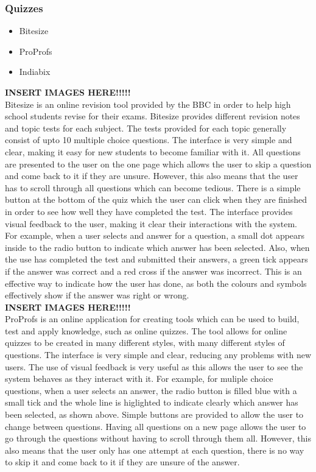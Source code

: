 \documentclass{article}
\begin{document}
\subsubsection{Quizzes}

\begin{itemize}
\item Bitesize
\item ProProfs
\item Indiabix
\end{itemize}

\textbf{INSERT IMAGES HERE!!!!!}\\

Bitesize is an online revision tool provided by the BBC in order to help high school students revise for their exams. Bitesize provides different revision notes and topic tests for each subject. The tests provided for each topic generally consist of upto 10 multiple choice questions. The interface is very simple and clear, making it easy for new students to become familiar with it. All questions are presented to the user on the one page which allows the user to skip a question and come back to it if they are unsure. However, this also means that the user has to scroll through all questions which can become tedious. There is a simple button at the bottom of the quiz which the user can click when they are finished in order to see how well they have completed the test. The interface provides visual feedback to the user, making it clear their interactions with the system. For example, when a user selects and answer for a question, a small dot appears inside to the radio button to indicate which answer has been selected. Also, when the use has completed the test and submitted their answers, a green tick appears if the answer was correct and a red cross if the answer was incorrect. This is an effective way to indicate how the user has done, as both the colours and symbols effectively show if the answer was right or wrong.\\
 
\textbf{INSERT IMAGES HERE!!!!!}\\

ProProfs is an online application for creating tools which can be used to build, test and apply knowledge, such as online quizzes. The tool allows for online quizzes to be created in many different styles, with many different styles of questions. The interface is very simple and clear, reducing any problems with new users. The use of visual feedback is very useful as this allows the user to see the system behaves as they interact with it. For example, for muliple choice questions, when a user selects an answer, the radio button is filled blue with a small tick and the whole line is higlighted to indicate clearly which answer has been selected, as shown above. Simple buttons are provided to allow the user to change between questions. Having all questions on a new page allows the user to go through the questions without having to scroll through them all. However, this also means that the user only has one attempt at each question, there is no way to skip it and come back to it if they are unsure of the answer.\\
\end{document}
